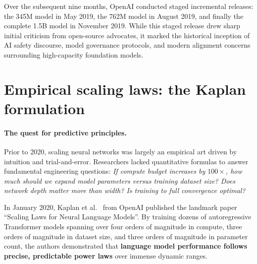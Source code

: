 \documentclass[../../main.tex]{subfiles}
\begin{document}
Over the subsequent nine months, OpenAI conducted staged incremental releases: the 345M model in May 2019, the 762M model in August 2019, and finally the complete 1.5B model in November 2019. While this staged release drew sharp initial criticism from open-source advocates, it marked the historical inception of AI safety discourse, model governance protocols, and modern alignment concerns surrounding high-capacity foundation models.

\section{Empirical scaling laws: the Kaplan formulation}
\label{sec:kaplan_scaling_laws}

\paragraph{The quest for predictive principles.}
Prior to 2020, scaling neural networks was largely an empirical art driven by intuition and trial-and-error. Researchers lacked quantitative formulas to answer fundamental engineering questions: \emph{If compute budget increases by $100\times$, how much should we expand model parameters versus training dataset size? Does network depth matter more than width? Is training to full convergence optimal?}

In January 2020, Kaplan et al.~\cite{kaplan2020} from OpenAI published the landmark paper ``Scaling Laws for Neural Language Models''. By training dozens of autoregressive Transformer models spanning over four orders of magnitude in compute, three orders of magnitude in dataset size, and three orders of magnitude in parameter count, the authors demonstrated that \textbf{language model performance follows precise, predictable power laws} over immense dynamic ranges.
\end{document}
